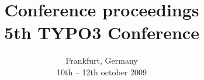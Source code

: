 \documentclass[a4paper,11pt,twoside,DIV15,headinclude,1headlines]{scrartcl}
\begin{document}
\title{Conference proceedings\\5th TYPO3 Conference}

\author{Frankfurt, Germany\\10th --  12th october 2009}
\date{\ }
\maketitle
\thispagestyle{empty}
\newpage



\end{document}
